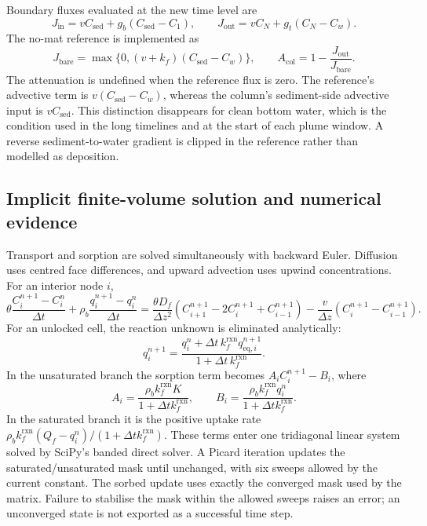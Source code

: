 Boundary fluxes evaluated at the new time level are
\begin{equation}
 J_{\mathrm{in}}=vC_{\mathrm{sed}}+g_b(C_{\mathrm{sed}}-C_1),\qquad
 J_{\mathrm{out}}=vC_N+g_t(C_N-C_w).
 \label{eq:boundary_fluxes}
\end{equation}
The no-mat reference is implemented as
\begin{equation}
 J_{\mathrm{bare}}=\max\{0,(v+k_f)(C_{\mathrm{sed}}-C_w)\},\qquad
 A_{\mathrm{col}}=1-\frac{J_{\mathrm{out}}}{J_{\mathrm{bare}}}.
 \label{eq:bare_attenuation}
\end{equation}
The attenuation is undefined when the reference flux is zero. The reference's advective term is $v(C_{\mathrm{sed}}-C_w)$, whereas the column's sediment-side advective input is $vC_{\mathrm{sed}}$. This distinction disappears for clean bottom water, which is the condition used in the long timelines and at the start of each plume window. A reverse sediment-to-water gradient is clipped in the reference rather than modelled as deposition.

\subsection{Implicit finite-volume solution and numerical evidence}
\label{sec:column_numerics}

Transport and sorption are solved simultaneously with backward Euler. Diffusion uses centred face differences, and upward advection uses upwind concentrations. For an interior node $i$,
\begin{equation}
 \theta\frac{C_i^{n+1}-C_i^n}{\Delta t}
 +\rho_b\frac{q_i^{n+1}-q_i^n}{\Delta t}
 =\frac{\theta D_f}{\Delta z^2}
 (C_{i+1}^{n+1}-2C_i^{n+1}+C_{i-1}^{n+1})
 -\frac{v}{\Delta z}(C_i^{n+1}-C_{i-1}^{n+1}).
 \label{eq:discrete_column}
\end{equation}
For an unlocked cell, the reaction unknown is eliminated analytically:
\begin{equation}
 q_i^{n+1}=\frac{q_i^n+\Delta t\,k_f^{\mathrm{rxn}}q_{\mathrm{eq},i}^{n+1}}
 {1+\Delta t\,k_f^{\mathrm{rxn}}}.
 \label{eq:implicit_q}
\end{equation}
In the unsaturated branch the sorption term becomes $A_iC_i^{n+1}-B_i$, where
\begin{equation}
 A_i=\frac{\rho_b k_f^{\mathrm{rxn}}K}{1+\Delta t k_f^{\mathrm{rxn}}},\qquad
 B_i=\frac{\rho_b k_f^{\mathrm{rxn}}q_i^n}{1+\Delta t k_f^{\mathrm{rxn}}}.
\end{equation}
In the saturated branch it is the positive uptake rate
$\rho_b k_f^{\mathrm{rxn}}(Q_f-q_i^n)/(1+\Delta t k_f^{\mathrm{rxn}})$.
These terms enter one tridiagonal linear system solved by SciPy's banded direct solver. A Picard iteration updates the saturated/unsaturated mask until unchanged, with six sweeps allowed by the current constant. The sorbed update uses exactly the converged mask used by the matrix. Failure to stabilise the mask within the allowed sweeps raises an error; an unconverged state is not exported as a successful time step.

